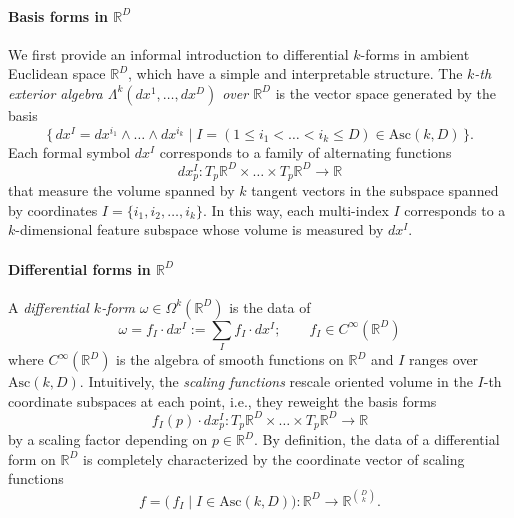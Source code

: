 \documentclass{article}
\newcommand{\R}{\mathbb{R}}
\theoremstyle{remark}
\theoremstyle{plain}
\begin{document}
\paragraph{Basis forms in $\R^D$} We first provide an informal introduction to differential $k$-forms in ambient Euclidean space $\R^D$, which have a simple and interpretable structure. The \textit{$k$-th exterior algebra $\Lambda^k(dx^1, \ldots, dx^D)$ over $\R^D$}  is the vector space generated by the basis
\begin{equation}
      \big\{\, dx^I = dx^{i_1} \wedge \ldots \wedge dx^{i_k} \mid I = (1 \leq i_1 < \ldots < i_k \leq D) \in \text{Asc}(k,D) \, \big\}.
\end{equation} Each formal symbol $dx^I$ corresponds to a family of alternating functions
\begin{equation}
    dx^I_p : T_p \R^D \times \ldots \times T_p\R^D \to \R
\end{equation} that measure the volume spanned by $k$ tangent vectors in the subspace spanned by coordinates $I = \{ i_1, i_2, \ldots, i_k\}$. In this way, each multi-index $I$ corresponds to a $k$-dimensional feature subspace whose volume is measured by $dx^I$.

\paragraph{Differential forms in $\R^D$} A \textit{differential $k$-form} $\omega \in \Omega^k(\R^D)$ is the data of
\begin{equation}
    \omega = f_I \cdot dx^I := \sum_I f_I \cdot dx^I; \qquad f_I\in C^\infty(\R^D)
\end{equation} where $C^\infty(\R^D)$ is the algebra of smooth functions on $\R^D$ and $I$ ranges over $\text{Asc}(k,D)$. Intuitively, the \textit{scaling functions} rescale oriented volume in the $I$-th coordinate subspaces at each point, i.e., they reweight the basis forms
\begin{equation}
f_I(p) \cdot dx^I_p : T_p \R^D \times \ldots \times T_p\R^D \to \R
\end{equation} by a scaling factor depending on $p \in \R^D$. By definition, the data of a differential form on $\R^D$ is completely characterized by the coordinate vector of scaling functions
\begin{equation}
    f = \Big( \, f_I \mid I \in \text{Asc}(k,D) \Big) : \R^D \to \R^{\binom{D}{k}}.
\end{equation}
\end{document}

